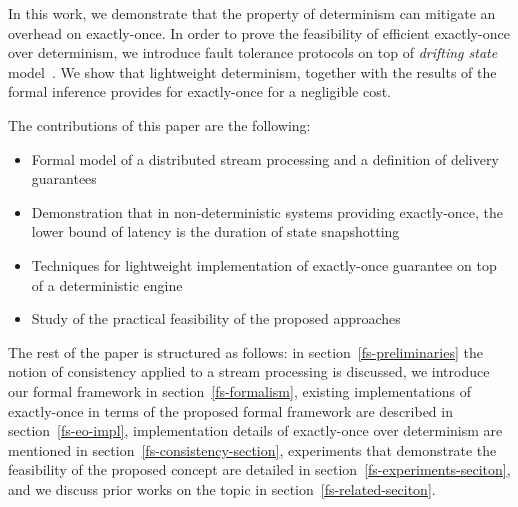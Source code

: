 In this work, we demonstrate that the property of determinism can mitigate an overhead on exactly-once. 
In order to prove the feasibility of efficient exactly-once over determinism, we introduce fault tolerance protocols on top of {\em drifting state} model~\cite{we2018adbis}. 
We show that lightweight determinism, together with the results of the formal inference provides for exactly-once for a negligible cost.

The contributions of this paper are the following: 
\begin{itemize}
    \item Formal model of a distributed stream processing  and   a   definition of  delivery guarantees 
    \item Demonstration that in non-deterministic systems providing exactly-once, the lower bound of latency is the duration of state snapshotting
    \item Techniques for lightweight implementation of exactly-once guarantee on top of a deterministic engine
    \item Study of the practical feasibility of the proposed approaches
\end{itemize}

The rest of the paper is structured as follows: 
in section~\ref{fs-preliminaries} the notion of consistency applied to a stream processing is discussed, 
we introduce our formal framework in section~\ref{fs-formalism}, 
existing implementations of exactly-once in terms of the proposed formal framework are described in section~\ref{fs-eo-impl}, 
implementation details of exactly-once over determinism are mentioned in section~\ref{fs-consistency-section}, 
experiments that demonstrate the feasibility of the proposed concept are detailed in section~\ref{fs-experiments-seciton}, 
and we discuss prior works on the topic in section~\ref{fs-related-seciton}. 
